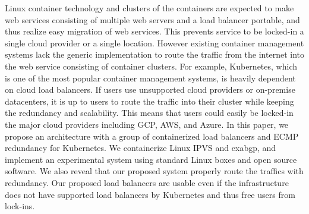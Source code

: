 \begin{summary}
Linux container technology and clusters of the containers are expected to make web services consisting of multiple web servers and a load balancer portable, and thus realize easy migration of web services.
This prevents service to be locked-in a single cloud provider or a single location.
However existing container management systems lack the generic implementation to route the traffic from the internet into the web service consisting of container clusters.
For example, Kubernetes, which is one of the most popular container management systems, is heavily dependent on cloud load balancers. If users use unsupported cloud providers or on-premise datacenters, it is up to users to route the traffic into their cluster while keeping the redundancy and scalability.
This means that users could easily be locked-in the major cloud providers including GCP, AWS, and Azure.
In this paper, we propose an architecture with a group of containerized load balancers and ECMP redundancy for Kubernetes.
We containerize Linux IPVS and exabgp, and implement an experimental system using standard Linux boxes and open source software.
We also reveal that our proposed system properly route the traffics with redundancy.
Our proposed load balancers are usable even if the infrastructure does not have supported load balancers by Kubernetes and thus free users from lock-ins.
\end{summary}

